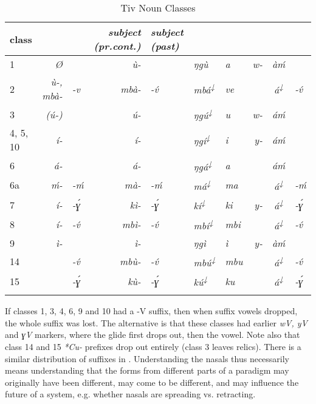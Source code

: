 \documentclass[output=paper]{langsci/langscibook}
\begin{document}
\begin{table}
\begin{tabularx}{\textwidth}{l >{\itshape}r@{ }>{\itshape}l >{\itshape}r@{ }>{\itshape}l >{\itshape}l>{\itshape}l@{} >{\itshape}r@{}>{\itshape}c@{}>{\itshape}l}
\lsptoprule
\textup{class} & \multicolumn{2}{l}{\upshape noun affixes} & \multicolumn{2}{l}{\upshape adjective} & {\upshape subject (pr.cont.)} & {\upshape subject (past)} & \multicolumn{3}{c}{\upshape ‘my’}\\
\midrule
1 & Ø &  & ù- &  & ŋgù & a &  w- & àḿ & \\
2 & ù-, mbà- & -v & mbà- & -\'{v} & mbá\textsuperscript{↓} & ve &  & á\textsuperscript{↓} & -\'{v}\\
3 & (ú-) &  & ú- &  & ŋgú\textsuperscript{↓} & u &  w- & áḿ & \\
4, 5, 10 & í- &  & í- &  & ŋgí\textsuperscript{↓} & i &  y- & áḿ & \\
6 & á- &  & á- &  & ŋgá\textsuperscript{↓} & a &  & áḿ & \\
6a & ḿ- & -ḿ & mà- & -ḿ & má\textsuperscript{↓} & ma &  & á\textsuperscript{↓} & -ḿ\\
7 & í- & -ɣ́ & kì- & -ɣ́ & kí\textsuperscript{↓} & ki &  y- & á\textsuperscript{↓} & -ɣ́\\
8 & í- & -\'{v} & mbì- & -\'{v} & mbí\textsuperscript{↓} & mbi &  & á\textsuperscript{↓} & -\'{v}\\
9 & ì- &  & ì- &  & ŋgì & ì &  y- & àḿ & \\
14 &  & -\'{v} & mbù- & -\'{v} & mbú\textsuperscript{↓} & mbu &  & á\textsuperscript{↓} & -\'{v}\\
15 &  & -ɣ́ & kù- & -ɣ́ & kú\textsuperscript{↓} & ku &  & á\textsuperscript{↓} & -ɣ́\\
\lspbottomrule
\end{tabularx}

\caption{Tiv Noun Classes}
\label{tab:nasal:9}
\end{table}

If classes 1, 3, 4, 6, 9 and 10 had a -V suffix, then when suffix vowels dropped, the whole suffix was lost. The alternative is that these classes had earlier \textit{wV, yV} and \textit{ɣV} markers, where the glide first drops out, then the vowel. Note also that class 14 and 15 \textit{*Cu-} prefixes drop out entirely (class 3 leaves relics). There is a similar distribution of suffixes in  \citep[188]{Hyman1980nasalclasses}. Understanding the nasals thus necessarily means understanding that the forms from different parts of a paradigm may originally have been different, may come to be different, and may influence the future of a system, e.g. whether nasals are spreading vs. retracting.
\end{document}
